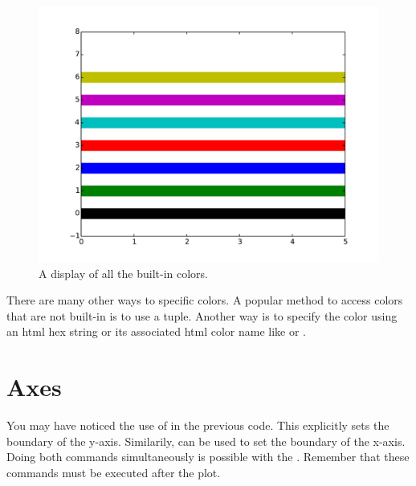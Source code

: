 \begin{figure}  %
\includegraphics[width=\textwidth]{colors.pdf}
\caption{A display of all the built-in colors.}
\label{colors} 
\end{figure}

There are many other ways to specific colors.
A popular method to access colors that are not built-in is to use a  tuple.
Another way is to specify the color using an html hex string or its associated html color name like  or .

\section*{Axes} %

You may have noticed the use of  in the previous code. This explicitly sets the boundary of the y-axis. Similarily,  can be used to set the boundary of the x-axis. 
Doing both commands simultaneously is possible with the . 
Remember that these commands must be executed after the plot. 

